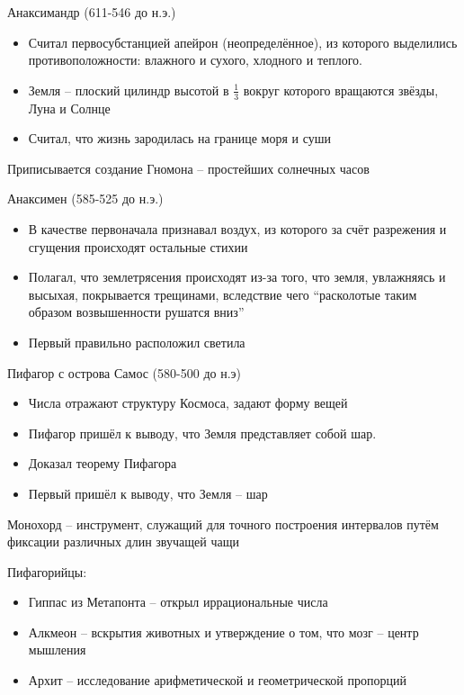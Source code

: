 \documentclass{book}
\theoremstyle{definition}
\begin{document}
    Анаксимандр (611-546 до н.э.)

    \begin{itemize}
        \item Считал первосубстанцией апейрон (неопределённое), из которого выделились противоположности: влажного и сухого, хлодного и теплого.
        \item Земля -- плоский цилиндр высотой в $\frac{1}{3}$ вокруг которого вращаются звёзды, Луна и Солнце
        \item Считал, что жизнь зародилась на границе моря и суши
    \end{itemize}

    Приписывается создание Гномона -- простейших солнечных часов

    Анаксимен (585-525 до н.э.)
    \begin{itemize}
        \item  В качестве первоначала признавал воздух, из которого за счёт разрежения и сгущения происходят остальные стихии
        \item Полагал, что землетрясения происходят из-за того, что земля, увлажняясь и высыхая, покрывается трещинами, вследствие чего ``расколотые таким образом возвышенности рушатся вниз''
        \item Первый правильно расположил светила
    \end{itemize}


    Пифагор с острова Самос (580-500 до н.э)
    \begin{itemize}
        \item Числа отражают структуру Космоса, задают форму вещей
        \item Пифагор пришёл к выводу, что Земля представляет собой шар.
        \item Доказал теорему Пифагора
        \item Первый пришёл к выводу, что Земля -- шар
    \end{itemize}
    Монохорд -- инструмент, служащий для точного построения интервалов путём фиксации различных длин звучащей чащи

    Пифагорийцы:
    \begin{itemize}
        \item Гиппас из Метапонта -- открыл иррациональные числа
        \item Алкмеон -- вскрытия животных и утверждение о том, что мозг -- центр мышления
        \item Архит -- исследование арифметической и геометрической пропорций
    \end{itemize}
\end{document}
